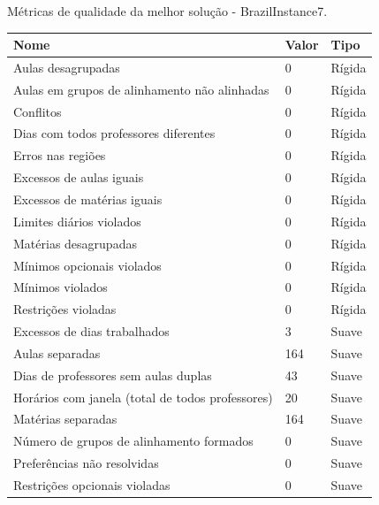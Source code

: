 \begin{quadro}[h]
	\centering
	\caption{Métricas de qualidade da melhor solução - BrazilInstance7.\label{qua:caracteristicas_horario_validacao_brazilinstance7}}
	\begin{tabular}{|p{8cm}|p{1cm}|p{3cm}|}
		\hline
		\textbf{Nome} & \textbf{Valor} & \textbf{Tipo} \\
		\hline
		Aulas desagrupadas & 0 & Rígida \\
		\hline
		Aulas em grupos de alinhamento não alinhadas & 0 & Rígida \\
		\hline
		Conflitos & 0 & Rígida \\
		\hline
		Dias com todos professores diferentes & 0 & Rígida \\
		\hline
		Erros nas regiões & 0 & Rígida \\
		\hline
		Excessos de aulas iguais & 0 & Rígida \\
		\hline
		Excessos de matérias iguais & 0 & Rígida \\
		\hline
		Limites diários violados & 0 & Rígida \\
		\hline
		Matérias desagrupadas & 0 & Rígida \\
		\hline
		Mínimos opcionais violados & 0 & Rígida \\
		\hline
		Mínimos violados & 0 & Rígida \\
		\hline
		Restrições violadas & 0 & Rígida \\
		\hline
		Excessos de dias trabalhados & 3 & Suave \\
		\hline
		Aulas separadas & 164 & Suave \\
		\hline
		Dias de professores sem aulas duplas & 43 & Suave \\
		\hline
		Horários com janela (total de todos professores) & 20 & Suave \\
		\hline
		Matérias separadas & 164 & Suave \\
		\hline
		Número de grupos de alinhamento formados & 0 & Suave \\
		\hline
		Preferências não resolvidas & 0 & Suave \\
		\hline
		Restrições opcionais violadas & 0 & Suave \\
		\hline
	\end{tabular}
\end{quadro}